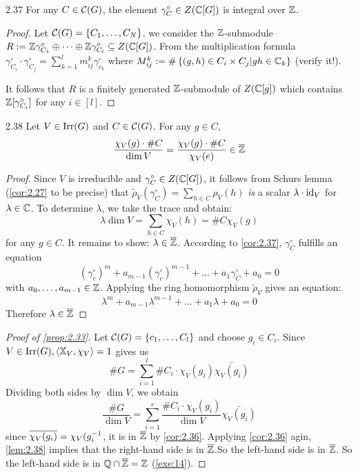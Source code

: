 \documentclass[twoside = false,	%
		headsepline,		%
		parskip = true,
		]{scrbook}						%
\begin{document}
    \begin{corollary}{}{2.37}
        For any $C\in\mathcal C(G)$, the element $\gamma_C^\circ\in Z(\mathbb C[G])$ is integral over $\mathbb Z$.
    \end{corollary}

    \begin{proof}
        Let $\mathcal C(G)=\left\{ C_1,\dots,C_N\right\}$. we consider the $\mathbb Z$-submodule $R:=\mathbb Z\gamma_{C_1}^\circ\oplus\dots\oplus\mathbb Z\gamma_{C_l}^\circ\subseteq Z(\mathbb C[G])$. From the multiplication formula $\gamma_{C_i}^\circ\cdot\gamma_{C_j}^\circ=\sum_{k=1}^lm_{ij}^k\gamma^\circ_{c_k}$ where $M_{ij}^k:=\#\left\{ (g,h)\in C_i\times C_j| gh\in \mathbb C_k\right\}$ (verify it!).

        It follows that $R$ is a finitely generated $\mathbb Z$-submodule of $Z(\mathbb C[g])$ which contains $\mathbb Z[\gamma_{C_i}^\circ]$ for any $i\in [l]$.
    \end{proof}
    
    \begin{lemma}{}{2.38}
        Let $V\in\mathrm{Irr}(G)$ and $C\in\mathcal C(G)$. For any $g\in C$, 
        $$\frac{\chi_V(g)\cdot\#C}{\dim V}=\frac{\chi_V(g)\cdot\#C}{\chi_V(e)}\in\overline{\mathbb Z}$$
        
    \end{lemma}
    
    \begin{proof}
        Since $V$ is irreducible and $\gamma_C^\circ\in Z(\mathbb C[G])$, it follows from Schurs lemma (\ref{cor:2.27} to be precise) that $\tilde\rho_V(\gamma^\circ_C)=\sum_{h\in C}\rho_V(h)$ \textit{is} a scalar $\lambda\cdot \mathrm{id}_V$ for $\lambda\in\mathbb C$. To determine $\lambda$, we take the trace and obtain:
        $$\lambda\dim V=\sum_{h\in C}\chi_V(h)=\#C\chi_V(g)$$ for any $g\in C$. It remains to show: $\lambda \in\overline {\mathbb Z}$.
        According to \ref{cor:2.37}, $\gamma_C^\circ$ fulfills an equation
        $$(\gamma_c^\circ)^m+a_{m-1}(\gamma_c^\circ)^{m-1}+\dots+ a_1\gamma_C^\circ+a_0=0$$
        with $a_0,\dots,a_{m-1}\in\mathbb Z$. Applying the ring homomorphism $\tilde\rho_V$ gives an equation:
        $$\lambda^m+a_{m-1}\lambda^{m-1}+\dots+a_1\lambda+a_0=0$$
        Therefore $\lambda\in\overline{\mathbb Z}$
    \end{proof}

    \begin{proof}[Proof of \ref{prop:2.33}]
        Let $\mathcal C(G)=\left\{ c_1,\dots,C_l\right\}$ and choose $g_i\in C_i$. Since $V\in\mathrm{Irr}(G), \left\langle \mathbb X_V,\chi_V\right\rangle=1$ gives us $$\#G=\sum_{i=1}^l\#C_i\cdot \chi_V(g_i)\bar{\chi_V(g_i)}$$
        Dividing both sides by $\dim V$, we obtain $$\frac{\#G}{\dim V}=\sum_{i=1}^r\frac{\# C_i\cdot\chi_V(g_i)}{\dim V}\bar{\chi_V(g_i)}$$
        since $\overline{\chi_V(g_i)}=\chi_V(g_i^{-1}$, it is in $\overline {\mathbb Z}$ by \ref{cor:2.36}.
        Applying \ref{cor:2.36} agin, \ref{lem:2.38} implies that the right-hand side is in $\overline {\mathbb Z}$.So the left-hand side is in $\overline{\mathbb Z}$. So the left-hand side is in $\mathbb Q\cap\overline{\mathbb Z}=\mathbb Z$ (\ref{exe:14}).
    \end{proof}
    
\end{document}
